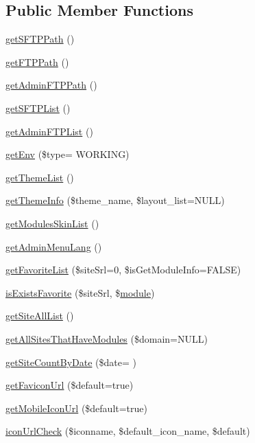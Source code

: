 \subsection*{Public Member Functions}
\begin{DoxyCompactItemize}
\item 
\hyperlink{classadminAdminModel_aaeac1a0a11439dfb4faa74751da8747e}{get\+S\+F\+T\+P\+Path} ()
\item 
\hyperlink{classadminAdminModel_a388c46fe906b6658eda70407ff9cdadb}{get\+F\+T\+P\+Path} ()
\item 
\hyperlink{classadminAdminModel_a155e29f18f17c6c657a457fcd65fd24b}{get\+Admin\+F\+T\+P\+Path} ()
\item 
\hyperlink{classadminAdminModel_adea58838b8595a28dc84d562bd1816ed}{get\+S\+F\+T\+P\+List} ()
\item 
\hyperlink{classadminAdminModel_a9e944aba1586e011811993745738728e}{get\+Admin\+F\+T\+P\+List} ()
\item 
\hyperlink{classadminAdminModel_afbd791a2932cb6f9f3d0550f4377829a}{get\+Env} (\$type= \textquotesingle{}W\+O\+R\+K\+I\+NG\textquotesingle{})
\item 
\hyperlink{classadminAdminModel_a2a331c8f7fea9c12f56f5f5f75a3960c}{get\+Theme\+List} ()
\item 
\hyperlink{classadminAdminModel_afa7d3525c94669a9cdd141051213a765}{get\+Theme\+Info} (\$theme\+\_\+name, \$layout\+\_\+list=N\+U\+LL)
\item 
\hyperlink{classadminAdminModel_adde903c6e5edecd8b68b1afb232c92fe}{get\+Modules\+Skin\+List} ()
\item 
\hyperlink{classadminAdminModel_a6e21a5731925dc94cce1859dd96e7f25}{get\+Admin\+Menu\+Lang} ()
\item 
\hyperlink{classadminAdminModel_aa50a1de27a9e8431e5a17fffc053dc1e}{get\+Favorite\+List} (\$site\+Srl=0, \$is\+Get\+Module\+Info=F\+A\+L\+SE)
\item 
\hyperlink{classadminAdminModel_a6ba3dfaa5f5f1cc41284676b9e0b7b9d}{is\+Exists\+Favorite} (\$site\+Srl, \$\hyperlink{classmodule}{module})
\item 
\hyperlink{classadminAdminModel_a12f25a1c61e11bf727019171564b1cad}{get\+Site\+All\+List} ()
\item 
\hyperlink{classadminAdminModel_afca5a07a3f42ccc8c2f635557c668b44}{get\+All\+Sites\+That\+Have\+Modules} (\$domain=N\+U\+LL)
\item 
\hyperlink{classadminAdminModel_a7123fd762d0fbefec95c0fa6263ffd62}{get\+Site\+Count\+By\+Date} (\$date= \textquotesingle{}\textquotesingle{})
\item 
\hyperlink{classadminAdminModel_a94cadc80816d875f0713507d356c422b}{get\+Favicon\+Url} (\$default=true)
\item 
\hyperlink{classadminAdminModel_a3ebcb91feca1cf88d6ed0bce9355ca6b}{get\+Mobile\+Icon\+Url} (\$default=true)
\item 
\hyperlink{classadminAdminModel_ab77b7dd452e81ca285debe37a159e0d7}{icon\+Url\+Check} (\$iconname, \$default\+\_\+icon\+\_\+name, \$default)
\end{DoxyCompactItemize}
